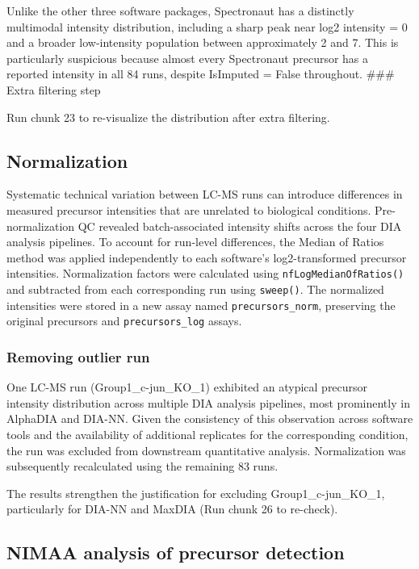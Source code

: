 \documentclass[
  10pt,
]{article}
\begin{document}
Unlike the other three software packages, Spectronaut has a distinctly
multimodal intensity distribution, including a sharp peak near log2
intensity = 0 and a broader low-intensity population between
approximately 2 and 7. This is particularly suspicious because almost
every Spectronaut precursor has a reported intensity in all 84 runs,
despite IsImputed = False throughout. \#\#\# Extra filtering step

Run chunk 23 to re-visualize the distribution after extra filtering.

\subsection{Normalization}\label{normalization}

Systematic technical variation between LC-MS runs can introduce
differences in measured precursor intensities that are unrelated to
biological conditions. Pre-normalization QC revealed batch-associated
intensity shifts across the four DIA analysis pipelines. To account for
run-level differences, the Median of Ratios method was applied
independently to each software's log2-transformed precursor intensities.
Normalization factors were calculated using
\texttt{nfLogMedianOfRatios()} and subtracted from each corresponding
run using \texttt{sweep()}. The normalized intensities were stored in a
new assay named \texttt{precursors\_norm}, preserving the original
precursors and \texttt{precursors\_log} assays.

\subsubsection{Removing outlier run}\label{removing-outlier-run}

One LC-MS run (Group1\_c-jun\_KO\_1) exhibited an atypical precursor
intensity distribution across multiple DIA analysis pipelines, most
prominently in AlphaDIA and DIA-NN. Given the consistency of this
observation across software tools and the availability of additional
replicates for the corresponding condition, the run was excluded from
downstream quantitative analysis. Normalization was subsequently
recalculated using the remaining 83 runs.

The results strengthen the justification for excluding
Group1\_c-jun\_KO\_1, particularly for DIA-NN and MaxDIA (Run chunk 26
to re-check).

\subsection{NIMAA analysis of precursor
detection}\label{nimaa-analysis-of-precursor-detection}
\end{document}
